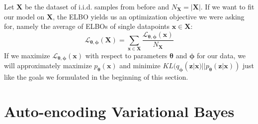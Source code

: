 \documentclass[12pt]{report}
\theoremstyle{definition}
\begin{document}
Let $\mathbf{X}$ be the dataset of i.i.d. samples from before and $N_{\mathbf{X}} = |\mathbf{X}|$. If we want to fit our model on $\mathbf{X}$, the ELBO yields us an optimization objective we were asking for, namely the average of ELBOs of single datapoints $\mathbf{x} \in \mathbf{X}$:
\begin{equation}
	\mathcal{L}_{\mathbf{\theta}, \mathbf{\phi}}(\mathbf{X}) = \sum_{\mathbf{x} \in \mathbf{X}} \frac{\mathcal{L}_{\mathbf{\theta}, \mathbf{\phi}}(\mathbf{x})}{N_{\mathbf{X}}}
\end{equation}
If we maximize $\mathcal{L}_{\mathbf{\theta}, \mathbf{\phi}}(\mathbf{x})$ with respect to parameters $\pmb{\theta}$ and $\pmb{\phi}$ for our data, we will approximately maximize $p_{\mathbf{\theta}}(\mathbf{x})$ and minimize $KL(q_{\mathbf{\phi}}(\mathbf{z}|\mathbf{x}) || p_{\mathbf{\theta}}(\mathbf{z}| \mathbf{x}))$ just like the goals we formulated in the beginning of this section.

\section{Auto-encoding Variational Bayes}
\end{document}
